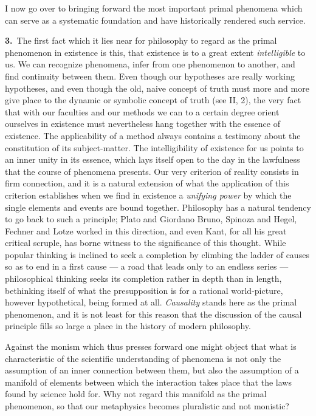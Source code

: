 \documentclass[12pt,a4paper]{book}
\newcommand{\opage}[1]{\marginnote{\footnotesize\textit{[#1]}}}
\begin{document}
I now go over to bringing forward the most important primal phenomena which can
serve as a systematic foundation and have historically rendered such service.

\noindent\textbf{3.}~The first fact which it lies near for philosophy to regard
as the primal phenomenon in existence is this, that existence is to a great
extent \emph{intelligible} to us. We can recognize phenomena, infer from one
phenomenon to another, and find continuity between them. Even though our
hypotheses are really working hypotheses, and even though the old, naive concept
of truth must more and more give place to the dynamic or symbolic concept of
truth (see II, 2), the very fact that with our faculties and our methods we can
to a certain degree orient ourselves in existence must nevertheless hang together
with the essence of existence. The applicability of a method always contains a
testimony about the constitution of its subject-matter. The intelligibility of
existence for us points to an inner unity in its essence, which lays itself open
to the day in the lawfulness that the course of phenomena presents. Our very
criterion of reality consists in firm connection, and it \opage{60}is a natural extension
of what the application of this criterion establishes when we find in existence a
\emph{unifying power} by which the single elements and events are bound together.
Philosophy has a natural tendency to go back to such a principle; Plato and
Giordano Bruno, Spinoza and Hegel, Fechner and Lotze worked in this direction,
and even Kant, for all his great critical scruple, has borne witness to the
significance of this thought. While popular thinking is inclined to seek a
completion by climbing the ladder of causes so as to end in a first cause --- a
road that leads only to an endless series --- philosophical thinking seeks its
completion rather in depth than in length, bethinking itself of what the
presupposition is for a rational world-picture, however hypothetical, being
formed at all. \emph{Causality} stands here as the primal phenomenon, and it is
not least for this reason that the discussion of the causal principle fills so
large a place in the history of modern philosophy.

Against the monism which thus presses forward one might object that what is
characteristic of the scientific understanding of phenomena is not only the
assumption of an inner connection between them, but also the assumption of a
manifold of elements between which the interaction takes place that the laws
found by science hold for. Why not regard this manifold as the primal phenomenon,
so that our metaphysics becomes pluralistic and not monistic?
\end{document}
